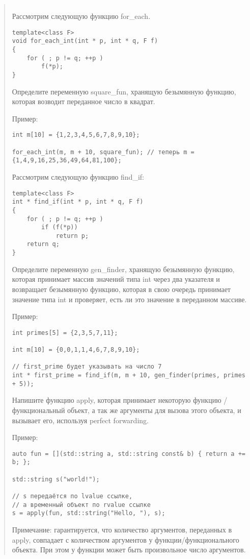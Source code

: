 \documentclass[]{article}
\begin{document}
\begin{quote}
\begin{verbatim}
\end{verbatim}

Рассмотрим следующую функцию for\_each.
\begin{verbatim}
template<class F>
void for_each_int(int * p, int * q, F f)
{
    for ( ; p != q; ++p )
        f(*p);
}
\end{verbatim}
Определите переменную square\_fun, хранящую безымянную функцию, которая возводит переданное число в квадрат.

Пример:
\begin{verbatim}
int m[10] = {1,2,3,4,5,6,7,8,9,10};

for_each_int(m, m + 10, square_fun); // теперь m = {1,4,9,16,25,36,49,64,81,100};
\end{verbatim}
Рассмотрим следующую функцию find\_if:
\begin{verbatim}
template<class F>
int * find_if(int * p, int * q, F f)
{
    for ( ; p != q; ++p )
        if (f(*p))
            return p;
    return q;
}
\end{verbatim}
Определите переменную gen\_finder, хранящую безымянную функцию, которая принимает массив значений типа int через два указателя и возвращает безымянную функцию, которая в свою очередь принимает значение типа int и проверяет, есть ли это значение в переданном массиве.

Пример:
\begin{verbatim}
int primes[5] = {2,3,5,7,11};

int m[10] = {0,0,1,1,4,6,7,8,9,10};

// first_prime будет указывать на число 7
int * first_prime = find_if(m, m + 10, gen_finder(primes, primes + 5));
\end{verbatim}




Напишите функцию apply, которая принимает некоторую функцию / функциональный объект, а так же аргументы для вызова этого объекта, и вызывает его, используя perfect forwarding.

Пример:
\begin{verbatim}
auto fun = [](std::string a, std::string const& b) { return a += b; };

std::string s("world!");

// s передаётся по lvalue ссылке,
// а временный объект по rvalue ссылке 
s = apply(fun, std::string("Hello, "), s);
\end{verbatim}
Примечание: гарантируется, что количество аргументов, переданных в apply, совпадает с количеством аргументов у функции/функционального объекта. При этом у функции может быть произвольное число аргументов.



\end{quote}
\end{document}
